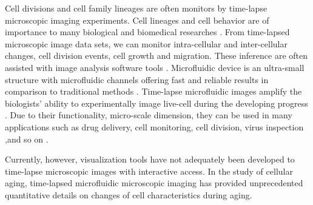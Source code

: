 \documentclass[conference]{IEEEtran}
\begin{document}
Cell divisions and cell family lineages are often monitors by time-lapse microscopic imaging experiments. 
Cell lineages and cell behavior are of importance to many biological and biomedical researches \cite{r2.6}. 
From time-lapsed microscopic image data sets, we can monitor intra-cellular and inter-cellular changes, cell division events, cell growth and migration. These inference are often assisted with image analysis software tools \cite{r2.7}.
Microfluidic device is an ultra-small structure with microfluidic channels offering fast and reliable results in comparison to traditional methods \cite {r2.1,r2.2}. Time-lapse microfluidic images amplify the biologists' ability to experimentally image live-cell during the developing progress \cite{r3}. Due to their functionality, micro-scale dimension, they can be used in many applications such as drug delivery, cell monitoring, cell division, virus inspection ,and so on \cite{r2.3,r2.4}. 

Currently, however, visualization tools have not adequately been developed to time-lapse microscopic images with interactive access. In the study of cellular aging, time-lapsed microfluidic microscopic imaging has provided unprecedented quantitative details on changes of cell characteristics during aging. 

\end{document}
